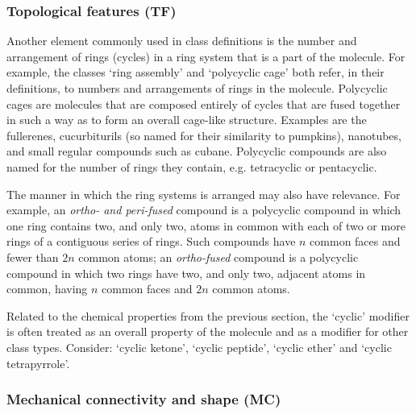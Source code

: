 \documentclass[10pt]{bmc_article}
\newenvironment{bmcformat}{\baselineskip20pt\sloppy\setboolean{publ}{false}}{\baselineskip20pt\sloppy}
\begin{document}
\begin{bmcformat}
\subsubsection*{Topological features (TF)}

Another element commonly used in class definitions is the number and arrangement of rings (cycles) in a ring system that is a part of the molecule. For example, the classes `ring assembly' and `polycyclic cage' both refer, in their definitions, to numbers and arrangements of rings in the molecule. Polycyclic cages are molecules that are composed entirely of cycles that are fused together in such a way as to form an overall cage-like structure.  Examples are the fullerenes, cucurbiturils (so named for their similarity to pumpkins), nanotubes, and small regular compounds such as cubane.  Polycyclic compounds are also named for the number of rings they contain, e.g. tetracyclic or  pentacyclic. 

The manner in which the ring systems is arranged may also have relevance. For example, an \textit{ortho- and peri-fused} compound is a polycyclic compound in which one ring contains two, and only two, atoms in common with each of two or more rings of a contiguous series of rings. Such compounds have $n$ common faces and fewer than $2n$ common atoms; an \textit{ortho-fused} compound is a polycyclic compound in which two rings have two, and only two, adjacent atoms in common, having $n$ common faces and $2n$ common atoms.

Related to the chemical properties from the previous section, the `cyclic' modifier is often treated as an overall property of the molecule and as a modifier for other class types. Consider: `cyclic ketone', `cyclic peptide', %
 `cyclic ether' and `cyclic tetrapyrrole'.

\subsubsection*{Mechanical connectivity and shape (MC)}


\end{bmcformat}
\end{document}
